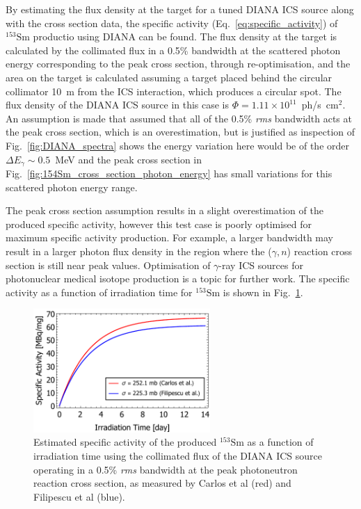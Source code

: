 \documentclass[../main.tex]{subfiles}
\begin{document}
By estimating the flux density at the target for a tuned DIANA ICS source along with the cross section data, the specific activity (Eq.~\ref{eq:specific_activity}) of $^{153}\mathrm{Sm}$ productio using DIANA can be found. The flux density at the target is calculated by the collimated flux in a 0.5\% bandwidth at the scattered photon energy corresponding to the peak cross section, through re-optimisation, and the area on the target is calculated assuming a target placed behind the circular collimator 10~\si{\meter} from the ICS interaction, which produces a circular spot. The flux density of the DIANA ICS source in this case is $\Phi=1.11\times 10^{11}$~ph/\si{\second\centi\meter}$^{2}$. An assumption is made that assumed that all of the 0.5\% \textit{rms} bandwidth acts at the peak cross section, which is an overestimation, but is justified as inspection of Fig.~\ref{fig:DIANA_spectra} shows the energy variation here would be of the order $\Delta E_{\gamma}\sim0.5$~\si{\mega\electronvolt} and the peak cross section in Fig.~\ref{fig:154Sm_cross_section_photon_energy} has small variations for this scattered photon energy range. 

The peak cross section assumption results in a slight overestimation of the produced specific activity, however this test case is poorly optimised for maximum specific activity production. For example, a larger bandwidth may result in a larger photon flux density in the region where the ($\gamma,n$) reaction cross section is still near peak values. Optimisation of $\gamma$-ray ICS sources for photonuclear medical isotope production is a topic for further work. The specific activity as a function of irradiation time for $^{153}\mathrm{Sm}$ is shown in Fig.~\ref{fig:153Sm_specific_activity}.
\begin{figure}[!h]
\centering
\includegraphics[width=0.6\textwidth]{Figures/DIANA_Inverse_Compton_Source_Design/154Sm_specific_activity.pdf}
\caption{Estimated specific activity of the produced $^{153}\mathrm{Sm}$ as a function of irradiation time using the collimated flux of the DIANA ICS source operating in a 0.5\% \textit{rms} bandwidth at the peak photoneutron reaction cross section, as measured by Carlos et al \cite{carlos1974giant} (red) and Filipescu et al \cite{filipescu2014photoneutron} (blue).}
\label{fig:153Sm_specific_activity}
\end{figure}
\end{document}

